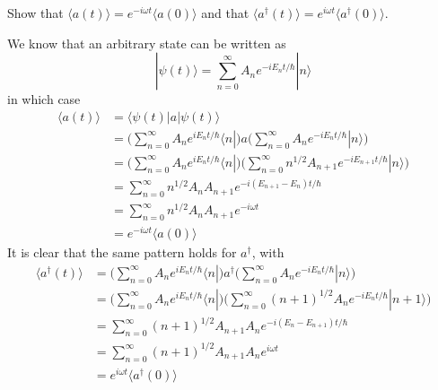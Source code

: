 \documentclass[../principles-of-quantum-mechanics.tex]{subfiles}
\begin{document}
\begin{questions}
		\question Show that $\langle a(t) \rangle = e^{-i\omega t}\langle a(0)\rangle$ and that $\langle a^\dagger(t)\rangle = e^{i\omega t}\langle a^\dagger(0)\rangle$.
		\begin{solution}
			We know that an arbitrary state can be written as
			$$|\psi(t)\rangle = \sum_{n=0}^{\infty}A_ne^{-iE_nt/\hbar}|n\rangle$$
			in which case
			\begin{align*}
				\langle a(t)\rangle &= \langle \psi(t)|a|\psi(t)\rangle \\
				&= \Big(\sum_{n=0}^{\infty}A_ne^{iE_nt/\hbar}\langle n|\Big)a\Big(\sum_{n=0}^{\infty}A_ne^{-iE_nt/\hbar}|n\rangle\Big) \\
				&= \Big(\sum_{n=0}^{\infty}A_ne^{iE_nt/\hbar}\langle n|\Big)\Big(\sum_{n=0}^{\infty}n^{1/2}A_{n+1}e^{-iE_{n+1}t/\hbar}|n\rangle\Big) \\
				&= \sum_{n=0}^{\infty}n^{1/2}A_nA_{n+1}e^{-i(E_{n+1}-E_n)t/\hbar} \\
				&= \sum_{n=0}^{\infty}n^{1/2}A_nA_{n+1}e^{-i\omega t} \\
				&= e^{-i\omega t}\langle a(0)\rangle
			\end{align*}
			It is clear that the same pattern holds for $a^\dagger$, with
			\begin{align*}
				\langle a^\dagger(t)\rangle &= \Big(\sum_{n=0}^{\infty}A_ne^{iE_nt/\hbar}\langle n|\Big)a^\dagger\Big(\sum_{n=0}^{\infty}A_ne^{-iE_nt/\hbar}|n\rangle\Big) \\
				&= \Big(\sum_{n=0}^{\infty}A_ne^{iE_nt/\hbar}\langle n|\Big)\Big(\sum_{n=0}^{\infty}(n+1)^{1/2}A_{n}e^{-iE_{n}t/\hbar}|n + 1\rangle\Big) \\
				&= \sum_{n=0}^{\infty}(n+1)^{1/2}A_{n+1}A_ne^{-i(E_n - E_{n+1})t/\hbar} \\
				&= \sum_{n=0}^{\infty}(n+1)^{1/2}A_{n+1}A_ne^{i\omega t} \\
				&= e^{i\omega t}\langle a^\dagger(0)\rangle
			\end{align*}
		\end{solution}
		

\end{questions}
\end{document}
